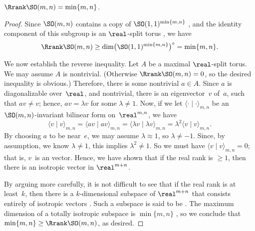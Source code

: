 \begin{prop} \label{Rrank(SOmn)}
 $\Rrank \SO(m,n)  = \min\{m,n\}$.
 \end{prop}

\begin{proof} 
Since $\SO(m,n)$ contains a copy of $\SO(1,1)^{\min\{m,n\}}$ , and the identity component of this subgroup is an $\real$-split torus , we have
	$$ \Rrank \SO(m,n) \ge \dim \bigl( \SO(1,1)^{\min\{m,n\}} \bigr)^\circ = \min\{m,n\}. $$

We now establish the reverse inequality. Let $A$ be a maximal $\real$-split torus. We may assume $A$ is nontrivial. (Otherwise $\Rrank \SO(m,n) = 0$, so the desired inequality is obvious.) Therefore, there is some nontrivial $a \in A$. Since $a$ is diagonalizable over~$\real$, and nontrivial, there is an eigenvector~$v$ of~$a$, such that $av \neq v$; hence, $av = \lambda v$ for some $\lambda \neq 1$. Now, if we let $\langle \cdot \mid \cdot \rangle_{m,n}$ be an $\SO(m,n)$-invariant bilinear form on~$\real^{m,n}$, we have
	$$ \langle v \mid v \rangle_{m,n}
	= \langle av \mid av \rangle_{m,n}
	= \langle \lambda v \mid \lambda v \rangle_{m,n}
	= \lambda^2 \langle v \mid v \rangle_{m,n}
	. $$
By choosing $a$ to be near~$e$, we may assume $\lambda \approx 1$, so $\lambda \neq -1$. Since, by assumption, we know $\lambda \neq 1$, this implies $\lambda^2 \neq 1$. So we must have $ \langle v \mid v \rangle_{m,n} = 0$;
 that is, $v$~is an  vector.
 Hence, we have shown that if the real rank is $\ge 1$, then there is an isotropic vector in $\real^{m+n}$. 
 
 By arguing more carefully, it is not difficult to see that if the real rank is at least~$k$, then there is a $k$-dimensional subspace of $\real^{m+n}$ that consists entirely of isotropic vectors . Such a subspace is said to be . The maximum dimension of a totally isotropic subspace is $\min\{m,n\}$ , so we conclude that $\min\{m,n\} \ge \Rrank \SO(m,n)$, as desired.
 \end{proof}


